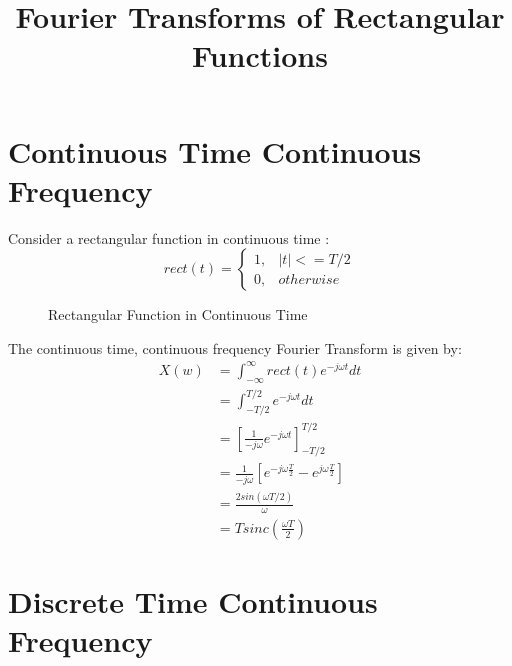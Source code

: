 \documentclass{article}
\begin{document}
\title{Fourier Transforms of Rectangular Functions}
\maketitle

\section{Continuous Time Continuous Frequency}

Consider a rectangular function in continuous time \cite{wikipedia_rect}:
\begin{equation}
rect(t)= 
	\begin{cases}
      1, & |t| <= T/2 \\
      0, & otherwise
	\end{cases}
\end{equation}

\begin{figure}[h]
\caption{Rectangular Function in Continuous Time}
\vspace{5mm}
\label{fig:rect_time}
\centering
{}
\end{figure}

The continuous time, continuous frequency Fourier Transform is given by:
\begin{equation} \label{eq:ctcf}
\begin{split}
X(w) &= \int_{-\infty}^{\infty} rect(t)e^{-j \omega t} dt\\
     &= \int_{-T/2}^{T/2} e^{-j \omega t} dt \\
     &= \left[ \frac{1}{-j \omega} e^{-j \omega t} \right]_{-T/2}^{T/2} \\
     &= \frac{1}{-j \omega} \left[  e^{-j \omega \frac{T}{2}} - e^{j \omega \frac{T}{2}} \right] \\
     &= \frac{2 sin(\omega T/2)}{\omega} \\
     &= T sinc \left( \frac{\omega T}{2} \right)
\end{split}
\end{equation}

\section{Discrete Time Continuous Frequency}
\end{document}
